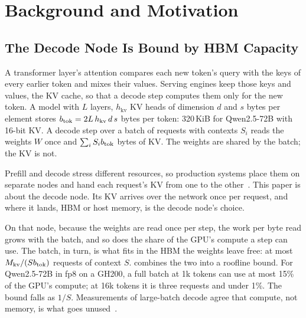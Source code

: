 
\section{Background and Motivation}\label{sec:background}

\subsection{The Decode Node Is Bound by HBM Capacity}

A transformer layer's attention compares each new token's query with the keys
of every earlier token and mixes their values. Serving engines keep those keys
and values, the KV cache, so that a decode step computes them only for the new
token. A model with $L$ layers, $h_{\mathrm{kv}}$ KV heads of dimension $d$
and $s$ bytes per element stores $b_{\mathrm{tok}} = 2L\,h_{\mathrm{kv}}\,d\,s$ bytes per
token: 320\,KiB for Qwen2.5-72B with 16-bit KV. A decode step over a batch of
requests with contexts $S_i$ reads the weights $W$ once and
$\sum_i S_ib_{\mathrm{tok}}$ bytes of KV. The weights are shared by the batch; the KV is
not.

Prefill and decode stress different resources, so production systems place
them on separate nodes and hand each request's KV from one to the
other~\cite{distserve,splitwise,mooncake}. This paper is about the decode
node. Its KV arrives over the network once per request, and where it lands,
HBM or host memory, is the decode node's choice.



On that node, because the weights are read once per step, the work per byte read grows with
the batch, and so does the share of the GPU's compute a step can use. The
batch, in turn, is what fits in the HBM the weights leave free: at most
$M_{\mathrm{kv}}/(Sb_{\mathrm{tok}})$ requests of context $S$.  combines the two into
a roofline bound. For Qwen2.5-72B in fp8 on a GH200, a full batch at 1k tokens
can use at most 15\% of the GPU's compute; at 16k tokens it is three requests
and under 1\%. The bound falls as $1/S$. Measurements of large-batch decode
agree that compute, not memory, is what goes unused~\cite{mindgap}.


